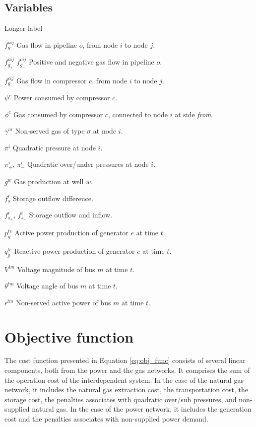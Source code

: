 \subsection*{Variables}

\begin{labeling}{Longer label\quad}
\item [${f}_{g}^{oij}$] Gas flow in pipeline $o$, from node $i$ to node $j$.
\item [${f}_{g_+}^{oij}$ ${f}_{g_-}^{oij}$] Positive and negative gas flow in pipeline $o$.
\item [${f}_{g}^{cij}$] Gas flow in compressor $c$, from node $i$ to node $j$.
\item [$\psi^{c}$] Power consumed by compressor $c$.
\item [$\phi^{c}$] Gas consumed by compressor $c$, connected to node $i$ at side \textit{from}.
\item [$\gamma^{i \sigma}$] Non-served gas of type $\sigma$ at node $i$.
\item [$\pi^{i}$] Quadratic pressure at node $i$.
\item [${\pi}^{i}_{+}$, ${\pi}^{i}_{-}$] Quadratic over/under pressures at node $i$.
\item [$g^{w}$] Gas production at well $w$.
\item [$f_{s}^{i}$] Storage outflow difference.
\item [$f_{s_+}^{i}$, $f_{s_-}^{i}$] Storage outflow and inflow.
\item [$p_{g}^{te}$] Active power production of generator $e$ at time $t$.
\item [$q_{g}^{te}$] Reactive power production of generator $e$ at time $t$.
\item [$V^{tm}$] Voltage magnitude of bus $m$ at time $t$.
\item [$\theta^{tm}$] Voltage angle of bus $m$ at time $t$.
\item [$\epsilon^{tm}$] Non-served active power of bus $m$ at time $t$.
\end{labeling}
\section{Objective function}

The cost function presented in Equation \ref{eq:obj_func} consists of several linear components, both from the power and the gas networks. It comprises the sum of the operation cost  of the interdependent system. In the case of the natural gas network, it includes the natural gas extraction cost, the transportation cost, the storage cost, the penalties associates with quadratic over/sub pressures, and non-supplied natural gas. In the case of the power network, it includes the generation cost and the penalties associates with non-supplied power demand.

